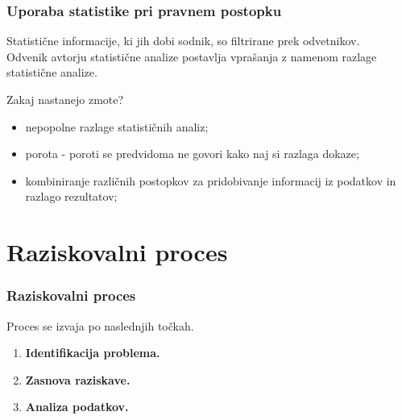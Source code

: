 \documentclass{beamer}
\begin{document}
\begin{frame}
    \frametitle{Uporaba statistike pri pravnem postopku}
    Statistične informacije, ki jih dobi sodnik, so filtrirane prek odvetnikov.\\
    Odvenik avtorju statistične analize postavlja vprašanja z namenom razlage statistične analize.\\ \vspace{3mm}
    \begin{block}{Zakaj nastanejo zmote?}
        \begin{itemize}
            \item nepopolne razlage statističnih analiz;
            \item porota - poroti se predvidoma ne govori kako naj si razlaga dokaze;
            \item kombiniranje različnih postopkov za pridobivanje informacij iz podatkov in razlago rezultatov;
        \end{itemize}
    \end{block}
\end{frame}

\section{Raziskovalni proces}
\begin{frame}
    \frametitle{Raziskovalni proces}
    Proces se izvaja po naslednjih točkah.\\ \vspace{2mm}
    \begin{enumerate}
        \item \textbf{Identifikacija problema.\\} 
        \item \textbf{Zasnova raziskave.\\} 
        \item \textbf{Analiza podatkov.\\}
    \end{enumerate}
\end{frame}

\end{document}
